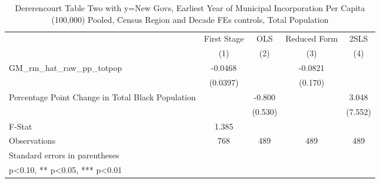 \begin{table}[htbp]\centering
\def\sym#1{\ifmmode^{#1}\else\(^{#1}\)\fi}
\caption{Dererencourt Table Two with y=New Govs, Earliest Year of Municipal Incorporation Per Capita (100,000) Pooled, Census Region and Decade FEs controls, Total Population}
\begin{tabular}{l*{4}{c}}
\toprule
                    & First Stage   &         OLS   &Reduced Form   &        2SLS   \\
                    &\multicolumn{1}{c}{(1)}   &\multicolumn{1}{c}{(2)}   &\multicolumn{1}{c}{(3)}   &\multicolumn{1}{c}{(4)}   \\
\midrule
GM\_rm\_hat\_raw\_pp\_totpop&     -0.0468   &               &     -0.0821   &               \\
                    &    (0.0397)   &               &     (0.170)   &               \\
\addlinespace
Percentage Point Change in Total Black Population&               &      -0.800   &               &       3.048   \\
                    &               &     (0.530)   &               &     (7.552)   \\
\midrule
F-Stat              &       1.385   &               &               &               \\
Observations        &         768   &         489   &         489   &         489   \\
\bottomrule
\multicolumn{5}{l}{\footnotesize Standard errors in parentheses}\\
\multicolumn{5}{l}{\footnotesize * p<0.10, ** p<0.05, *** p<0.01}\\
\end{tabular}
\end{table}
